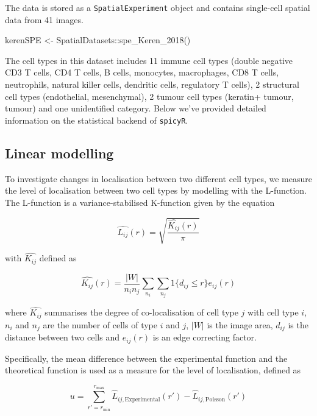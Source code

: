 \documentclass[
  letterpaper,
  DIV=11,
  numbers=noendperiod]{scrreprt}
\newenvironment{Shaded}{\begin{snugshade}}{\end{snugshade}}
\newcommand{\FunctionTok}[1]{\textcolor[rgb]{0.28,0.35,0.67}{#1}}
\newcommand{\NormalTok}[1]{\textcolor[rgb]{0.00,0.23,0.31}{#1}}
\newcommand{\OtherTok}[1]{\textcolor[rgb]{0.00,0.23,0.31}{#1}}
\newcommand{\SpecialCharTok}[1]{\textcolor[rgb]{0.37,0.37,0.37}{#1}}
\begin{document}
The data is stored as a \texttt{SpatialExperiment} object and contains
single-cell spatial data from 41 images.

\begin{Shaded}
\begin{Highlighting}[]
\NormalTok{kerenSPE }\OtherTok{\textless{}{-}}\NormalTok{ SpatialDatasets}\SpecialCharTok{::}\FunctionTok{spe\_Keren\_2018}\NormalTok{()}
\end{Highlighting}
\end{Shaded}

The cell types in this dataset includes 11 immune cell types (double
negative CD3 T cells, CD4 T cells, B cells, monocytes, macrophages, CD8
T cells, neutrophils, natural killer cells, dendritic cells, regulatory
T cells), 2 structural cell types (endothelial, mesenchymal), 2 tumour
cell types (keratin+ tumour, tumour) and one unidentified category.
Below we've provided detailed information on the statistical backend of
\texttt{spicyR}.

\subsection{Linear modelling}\label{linear-modelling}

To investigate changes in localisation between two different cell types,
we measure the level of localisation between two cell types by modelling
with the L-function. The L-function is a variance-stabilised K-function
given by the equation

\[
\widehat{L_{ij}} (r) = \sqrt{\frac{\widehat{K_{ij}}(r)}{\pi}}
\]

with \(\widehat{K_{ij}}\) defined as

\[
\widehat{K_{ij}} (r) = \frac{|W|}{n_i n_j} \sum_{n_i} \sum_{n_j} 1 \{d_{ij} \leq r \} e_{ij} (r)
\]

where \(\widehat{K_{ij}}\) summarises the degree of co-localisation of
cell type \(j\) with cell type \(i\), \(n_i\) and \(n_j\) are the number
of cells of type \(i\) and \(j\), \(|W|\) is the image area, \(d_{ij}\)
is the distance between two cells and \(e_{ij} (r)\) is an edge
correcting factor.

Specifically, the mean difference between the experimental function and
the theoretical function is used as a measure for the level of
localisation, defined as

\[
u = \sum_{r' = r_{\text{min}}}^{r_{\text{max}}} \widehat L_{ij, \text{Experimental}} (r') - \widehat L_{ij, \text{Poisson}} (r')
\]
\end{document}
